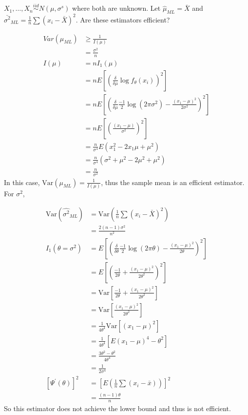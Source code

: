 \documentclass[11pt,fleqn]{book} %
\begin{document}
	\begin{example}
		$X_1, \dots, X_n \stackrel{iid}{\sim}	N(\mu, \sigma^s)$ where both are unknown. Let $\hat{\mu}_{ML} = \bar{X}$ and $\bar{\sigma^2}_{ML} =\frac{1}{n} \sum(x_i - \bar{X})^2$. Are these estimators efficient?
		
			\begin{align*}
				Var(\mu_{ML}) &\ge \frac{1}{I(\mu)}\\
			 	&= \frac{\sigma^2}{n}\\
			 	I(\mu) &= nI_1(\mu)\\
			 		&= nE\left[\left(\frac{\delta}{\delta \mu}\log f_\theta(x_i)\right)^2\right]\\
			 		&= nE\left[\left(\frac{\delta}{\delta \mu} \frac{-1}{2}\log\left(2\pi\sigma^2\right) - \frac{(x_1 - \mu)^2}{2\sigma^2}\right)^2\right]\\
			 		&= n E\left[\left(\frac{(x_1 - \mu)}{\sigma^2}\right)^2\right]\\
			 		&= \frac{n}{\sigma^4} E(x_1^2 -2x_1\mu + \mu^2)\\
			 		&= \frac{n}{\sigma^4}(\sigma^2 + \mu^2 - 2\mu^2 + \mu^2)\\
			 		&= \frac{n}{\sigma^2}
				\end{align*}		
			In this case, $\text{Var}(\mu_{ML}) = \frac{1}{I(\mu)}$, thus the sample mean is an efficient estimator.\\

			For $\sigma^2$, 

			\begin{align*}
			\text{Var}(\hat{\sigma^2}_{ML}) &= \text{Var}(\frac{1}{n} \sum(x_i - \bar{X})^2)\\
				&= \frac{2(n-1)\sigma^2}{n^2}\\
				I_1(\theta = \sigma^2) &= E \left[ \left( \frac{\delta}{\delta \theta} \frac{-1}{2}\log \left(2\pi\theta\right) - \frac{(x_1 - \mu)^2}{2\theta}\right)^2\right]\\
				&= E\left[\left(\frac{-1}{2\theta} + \frac{(x_1 - \mu)^2}{2\theta^2}\right)^2\right]\\
				&= \text{Var}\left[\frac{-1}{2\theta} + \frac{(x_1 - \mu)^2}{2\theta^2}\right]\\
				&= \text{Var}\left[\frac{(x_1 - \mu)^2}{2\theta^2}\right]\\
				&= \frac{1}{4\theta^4} \text{Var}\left[(x_1 - \mu)^2\right]\\
				&= \frac{1}{4\theta^4} \left[E(x_1 - \mu)^4 - \theta^2\right]\\ 
				&= \frac{3\theta^2 - \theta^2}{4 \theta^4}\\
				&= \frac{1}{2\sigma^4}\\
				\left[\Psi^\prime(\theta)\right]^2 &= \left[E \left( \frac{1}{n}\sum(x_i - \bar{x})  \right) \right]^2\\
					&= \frac{(n-1)\theta}{n}	
			\end{align*}
			So this estimator does not achieve the lower bound and thus is not efficient.

	\end{example}
\end{document}
